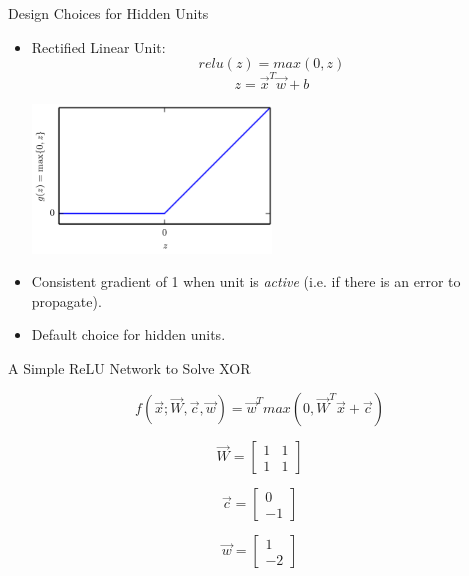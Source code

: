 
\begin{vbframe}{Design Choices for Hidden Units}

\vfill

\begin{itemize}
\item Rectified Linear Unit:
$$relu(z) = max(0,z)$$
$$z = \vec x^T\vec w + b$$
\begin{center}
\includegraphics[width = 0.5\textwidth]{./figure/relu}
\end{center}
\item Consistent gradient of 1 when unit is \emph{active} (i.e. if there is an error to propagate).
\item Default choice for hidden units.
\end{itemize}

\vfill

\end{vbframe}



\begin{vbframe}{A Simple ReLU Network to Solve XOR}

\vfill

$$f(\vec x; \vec W, \vec c, \vec w) = \vec w^T max(0, \vec W^T\vec x + \vec c)$$

\[\vec W = 
\begin{bmatrix}
 1 & 1 \\
 1 & 1
\end{bmatrix} 
\]

\[\vec c = 
\begin{bmatrix}
 0 \\
 -1
\end{bmatrix} 
\]

\[\vec w = 
\begin{bmatrix}
 1 \\
 -2
\end{bmatrix} 
\]

\vfill

\end{vbframe}


